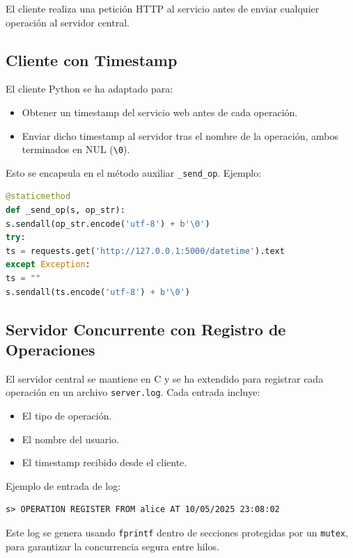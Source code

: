 \documentclass[12pt,a4paper]{article}
\begin{document}
El cliente realiza una petición HTTP al servicio antes de enviar cualquier operación al servidor central.

\subsection{Cliente con Timestamp}

El cliente Python se ha adaptado para:

\begin{itemize}
\item Obtener un timestamp del servicio web antes de cada operación.
\item Enviar dicho timestamp al servidor tras el nombre de la operación, ambos terminados en NUL (\texttt{\textbackslash0}).
\end{itemize}

Esto se encapsula en el método auxiliar \texttt{_send_op}. Ejemplo:

\begin{lstlisting}[language=Python,caption={Envío de operación con timestamp},label=lst:send_op]
@staticmethod
def _send_op(s, op_str):
s.sendall(op_str.encode('utf-8') + b'\0')
try:
ts = requests.get('http://127.0.0.1:5000/datetime').text
except Exception:
ts = ""
s.sendall(ts.encode('utf-8') + b'\0')
\end{lstlisting}

\subsection{Servidor Concurrente con Registro de Operaciones}

El servidor central se mantiene en C y se ha extendido para registrar cada operación en un archivo \texttt{server.log}. Cada entrada incluye:

\begin{itemize}
\item El tipo de operación.
\item El nombre del usuario.
\item El timestamp recibido desde el cliente.
\end{itemize}

Ejemplo de entrada de log:

\begin{verbatim}
s> OPERATION REGISTER FROM alice AT 10/05/2025 23:08:02
\end{verbatim}

Este log se genera usando \texttt{fprintf} dentro de secciones protegidas por un \texttt{mutex}, para garantizar la concurrencia segura entre hilos.
\end{document}
